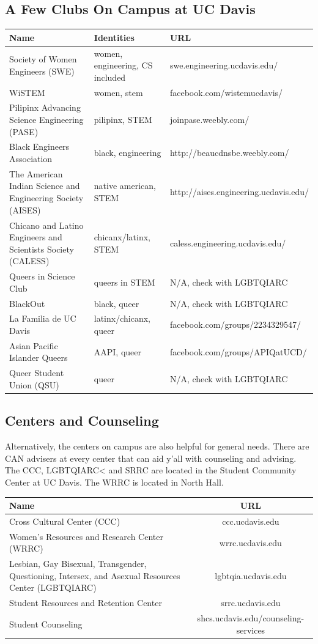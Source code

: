 \documentclass{article}
\begin{document}
\subsection{A Few Clubs On Campus at UC Davis}
\begin{tabular}{|p{5cm}|l|p{7cm}|}
\hline
\textbf{Name} & \textbf{Identities} & \textbf{URL} \\
\hline
Society of Women Engineers (SWE) & women, engineering, CS included & swe.engineering.ucdavis.edu/ \\
\hline
WiSTEM & women, stem & facebook.com/wistemucdavis/ \\
\hline
Pilipinx Advancing Science Engineering (PASE) & pilipinx, STEM & joinpase.weebly.com/ \\
\hline
Black Engineers Association & black, engineering & http://beaucdnsbe.weebly.com/ \\
\hline
The American Indian Science and Engineering Society (AISES) & native american, STEM & http://aises.engineering.ucdavis.edu/ \\
\hline
Chicano and Latino Engineers and Scientists Society (CALESS) & chicanx/latinx, STEM & caless.engineering.ucdavis.edu/ \\
\hline
Queers in Science Club & queers in STEM & N/A, check with LGBTQIARC\\
\hline
BlackOut & black, queer & N/A, check with LGBTQIARC \\
\hline
La Familia de UC Davis & latinx/chicanx, queer & facebook.com/groups/2234329547/ \\
\hline
Asian Pacific Islander Queers & AAPI, queer & facebook.com/groups/APIQatUCD/ \\
\hline
Queer Student Union (QSU) & queer & N/A, check with LGBTQIARC \\
\hline
\end{tabular}

\subsection{Centers and Counseling}
Alternatively, the centers on campus are also helpful for general needs. There are CAN advisers at every center that can aid y'all with counseling and advising. The CCC, LGBTQIARC< and SRRC are located in the Student Community Center at UC Davis. The WRRC is located in North Hall.\\ 

\begin{tabular} {|p{8cm}|c|}
\hline
\textbf{Name} & \textbf{URL} \\
\hline
Cross Cultural Center (CCC) & ccc.ucdavis.edu \\
\hline
Women's Resources and Research Center (WRRC) & wrrc.ucdavis.edu\\
\hline
Lesbian, Gay Bisexual, Transgender, Questioning, Intersex, and Asexual Resources Center (LGBTQIARC) & lgbtqia.ucdavis.edu \\
\hline
Student Resources and Retention Center & srrc.ucdavis.edu \\
\hline
Student Counseling & shcs.ucdavis.edu/counseling-services \\
\hline
\end{tabular}
\end{document}
